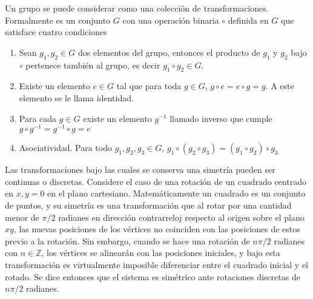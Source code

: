 Un grupo se puede considerar como una colección de transformaciones. Formalmente es un conjunto $G$ con una operación binaria $\circ$ definida en $G$ que satisface cuatro condiciones
\begin{enumerate}
  \item Sean $g_1,g_2 \in G$ dos elementos del grupo, entonces el producto de $g_1$ y $g_2$ bajo $\circ$ pertenece también al grupo, es decir $g_1 \circ g_2 \in G$.
  \item Existe un elemento $e\in G$ tal que para toda $g\in G$, $g\circ e = e\circ g = g$. A este elemento se le llama identidad.
  \item Para cada $g\in G$ existe un elemento $g^{-1}$ llamado inverso que cumple $g\circ g^{-1} = g^{-1}\circ g =e$
  \item Asociatividad. Para todo $g_1, g_2, g_3 \in G$, $g_1 \circ (g_2 \circ g_3) = (g_1 \circ g_2) \circ g_3$
\end{enumerate}
Las transformaciones bajo las cuales se conserva una simetría pueden ser continuas o discretas. Considere el caso de una rotación de un cuadrado centrado en $x,y=0$ en el plano cartesiano. Matemáticamente un cuadrado es un conjunto de puntos, y su simetría es una transformación que al rotar por una cantidad menor de $\pi/2$ radianes en dirección contrarreloj respecto al origen sobre el plano $xy$, las nuevas posiciones de los vértices no coinciden con las posiciones de estos previo a la rotación. Sin embargo, cuando se hace una rotación de $n\pi/2$ radianes con $n\in \mathbb{Z}$, los vértices se alinearán con las posiciones iniciales, y bajo esta transformación es virtualmente imposible diferenciar entre el cuadrado inicial y el rotado. Se dice entonces que el sistema es simétrico ante rotaciones discretas de $n\pi/2$ radianes.

